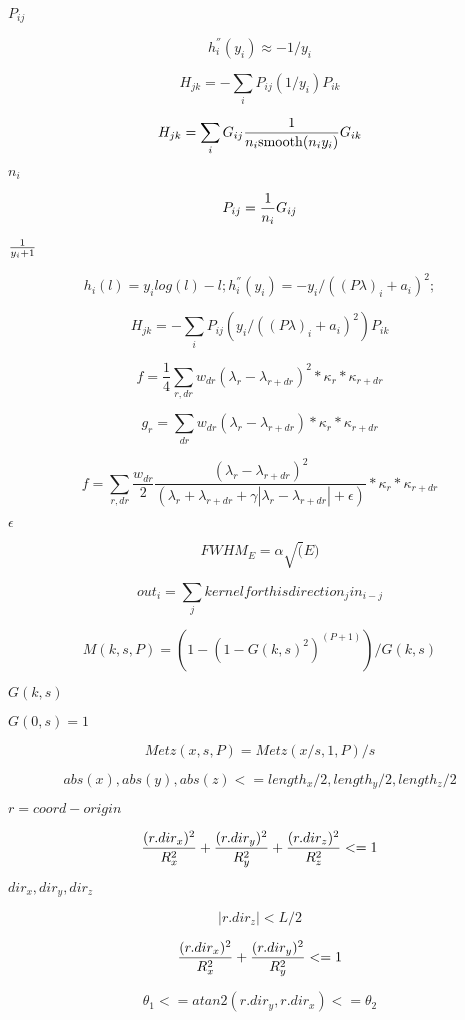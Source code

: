 \documentclass{article}
\begin{document}
$P_{ij} $
\pagebreak

\[ h_i^{''}(y_i) \approx -1/y_i \]
\pagebreak

\[ H_{jk} = - \sum_i P_{ij}(1/y_i) P_{ik} \]
\pagebreak

\[ H_{jk} = \sum_i G_{ij}{1 \over n_i \mathrm{smooth}( n_i y_i)} G_{ik} \]
\pagebreak

$n_i$
\pagebreak

\[ P_{ij} = {1 \over n_i } G_{ij}\]
\pagebreak

$1 \over y_i+1 $
\pagebreak

\[ h_i(l) = y_i log (l) - l; h_i^{''}(y_i) = - y_i / ((P \lambda)_i + a_i)^2; \]
\pagebreak

\[ H_{jk} = - \sum_i P_{ij}(y_i / ((P \lambda)_i + a_i)^2) P_{ik} \]
\pagebreak

\[ f = \frac{1}{4} \sum_{r,dr} w_{dr} (\lambda_r - \lambda_{r+dr})^2 * \kappa_r * \kappa_{r+dr} \]
\pagebreak

\[ g_r = \sum_{dr} w_{dr} (\lambda_r - \lambda_{r+dr}) * \kappa_r * \kappa_{r+dr} \]
\pagebreak

\[ f= \sum_{r,dr} \frac{w_{dr}}{2} \frac{(\lambda_r - \lambda_{r+dr})^2}{(\lambda_r+ \lambda_{r+dr} + \gamma |\lambda_r - \lambda_{r+dr}| + \epsilon)} * \kappa_r * \kappa_{r+dr} \]
\pagebreak

$\epsilon$
\pagebreak

\[ FWHM_E = \alpha \sqrt(E) \]
\pagebreak

\[ out_i = \sum_j kernelforthisdirection_j in_{i-j} \]
\pagebreak

\[ M(k,s,P) = (1 - (1 - G(k, s)^2)^{(P + 1)})/ G(k, s) \]
\pagebreak

$ G(k,s) $
\pagebreak

$G(0,s) = 1$
\pagebreak

\[ Metz(x,s,P) = Metz(x/s, 1 ,P)/s \]
\pagebreak

\[ abs(x), abs(y), abs(z) <= length_x/2, length_y/2, length_z/2 \]
\pagebreak

$r = coord - origin$
\pagebreak

\[ {(r.dir_x)^2 \over R_x^2} + {(r.dir_y)^2 \over R_y^2} + {(r.dir_z)^2 \over R_z^2} <= 1 \]
\pagebreak

$dir_x, dir_y, dir_z$
\pagebreak

\[ |r.dir_z|<L/2 \]
\pagebreak

\[ {(r.dir_x)^2 \over R_x^2} + {(r.dir_y)^2 \over R_y^2} <= 1 \]
\pagebreak

\[ \theta_1 <= atan2(r.dir_y,r.dir_x) <= \theta_2 \]
\pagebreak
\end{document}
